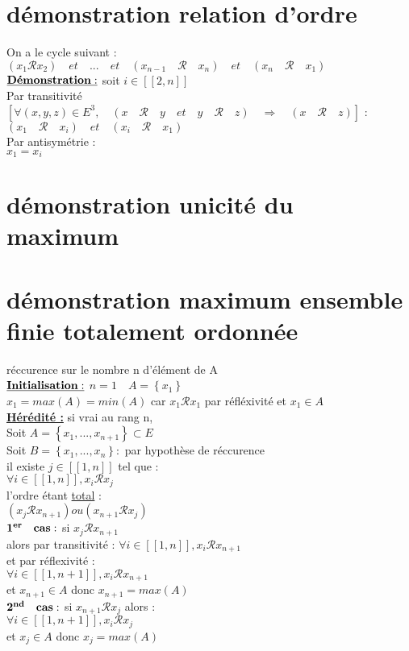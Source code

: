 \documentclass{article}
\begin{document}
    \section{d\'emonstration  relation d'ordre}
    On a le cycle suivant :\\
    $(x_1\mathcal{R}x_2) \quad et \quad ... \quad et \quad (x_{n-1} \quad\mathcal{R}\quad x_n) \quad et \quad (x_n \quad\mathcal{R}\quad x_1)$\\
    $ \bf \underline{D\acute{e}monstration :}$ soit $i \in [[2,n]]$\\
    Par transitivit\'e $[\forall (x,y,z) \in E^3, \quad (x \quad\mathcal{R}\quad y \quad et \quad y \quad\mathcal{R}\quad z )\quad \Rightarrow \quad (x \quad\mathcal{R}\quad z)]$ :\\
    \indent $(x_1 \quad\mathcal{R}\quad x_i) \quad et \quad (x_i \quad\mathcal{R}\quad x_1)$\\
    Par antisym\'etrie :\\
    \indent $x_1=x_i$
     \section{d\'emonstration unicit\'e du maximum }
    \section{d\'emonstration maximum ensemble finie totalement ordonn\'ee }
    r\'eccurence sur le nombre n d'\'el\'ement de A\\
    $ \bf \underline{Initialisation :}$ $n=1 \quad A=\left\lbrace x_1\right\rbrace $\\
    $x_1=max(A)=min(A)$ car $x_1\mathcal{R} x_1$ par r\'efl\'exivit\'e et $x_1 \in A$\\
     \underline{\bf{H\'er\'edit\'e :}} si vrai au rang n,\\
    Soit $A=\left\lbrace  x_1, ... ,x_{n+1} \right\rbrace \subset E$\\
    Soit $B=\left\lbrace x_1, ..., x_n \right\rbrace :$ par hypoth\`ese de r\'eccurence\\
    il existe $j \in [[1,n]]$ tel que :\\
    \indent $\forall i \in [[1,n]], x_i\mathcal{R}x_j$\\
    l'ordre \'etant \underline{total} :\\
    	$(x_j\mathcal{R}x_{n+1})ou(x_{n+1}\mathcal{R}x_j)$\\
    $ \bf 1^{er} \quad cas :$ si ${x_j\mathcal{R}x_{n+1}}$\\
    alors  par transitivit\'e : $\forall i \in [[1,n]], x_i\mathcal{R}x_{n+1}$\\
    et par r\'eflexivit\'e :\\
    \indent $\forall i \in [[1,n+1]], x_i\mathcal{R}x_{n+1}$\\
    et $x_{n+1} \in A$ donc $x_{n+1}=max(A)$\\
     $ \bf 2^{nd} \quad cas :$ si $x_{n+1}\mathcal{R}x_j$ alors :\\
     \indent $\forall i \in [[1,n+1]], x_i\mathcal{R}x_{j}$\\
     et $x_j \in A$ donc $x_j=max(A)$
\end{document}
